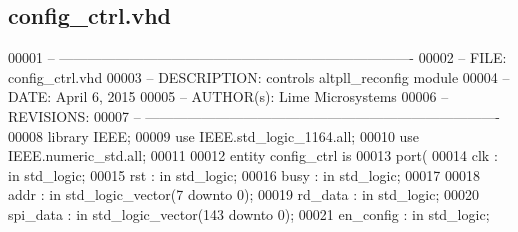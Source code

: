 \subsection{config\+\_\+ctrl.\+vhd}
\label{config__ctrl_8vhd_source}

\begin{DoxyCode}
00001 \textcolor{keyword}{-- ---------------------------------------------------------------------------- }
00002 \textcolor{keyword}{-- FILE:    config\_ctrl.vhd}
00003 \textcolor{keyword}{-- DESCRIPTION: controls altpll\_reconfig module}
00004 \textcolor{keyword}{-- DATE:    April 6, 2015}
00005 \textcolor{keyword}{-- AUTHOR(s):   Lime Microsystems}
00006 \textcolor{keyword}{-- REVISIONS:}
00007 \textcolor{keyword}{-- ----------------------------------------------------------------------------}
00008 \textcolor{vhdlkeyword}{library }\textcolor{keywordflow}{IEEE};
00009 \textcolor{vhdlkeyword}{use }IEEE.std\_logic\_1164.\textcolor{keywordflow}{all};
00010 \textcolor{vhdlkeyword}{use }IEEE.numeric\_std.\textcolor{keywordflow}{all};
00011 
00012 \textcolor{keywordflow}{entity }config_ctrl \textcolor{keywordflow}{is}
00013 \textcolor{keywordflow}{port}\textcolor{vhdlchar}{(}
00014     \textcolor{vhdlchar}{clk}     \textcolor{vhdlchar}{:} \textcolor{keywordflow}{in} \textcolor{comment}{std\_logic};
00015     \textcolor{vhdlchar}{rst}     \textcolor{vhdlchar}{:} \textcolor{keywordflow}{in} \textcolor{comment}{std\_logic};
00016     \textcolor{vhdlchar}{busy}    \textcolor{vhdlchar}{:} \textcolor{keywordflow}{in} \textcolor{comment}{std\_logic};
00017     
00018     \textcolor{vhdlchar}{addr}            \textcolor{vhdlchar}{:} \textcolor{keywordflow}{in} \textcolor{comment}{std\_logic\_vector}\textcolor{vhdlchar}{(}\textcolor{vhdllogic}{}\textcolor{vhdllogic}{7} \textcolor{keywordflow}{downto} \textcolor{vhdllogic}{}\textcolor{vhdllogic}{0}\textcolor{vhdlchar}{)};
00019     \textcolor{vhdlchar}{rd_data}         \textcolor{vhdlchar}{:} \textcolor{keywordflow}{in} \textcolor{comment}{std\_logic};
00020     \textcolor{vhdlchar}{spi_data}        \textcolor{vhdlchar}{:} \textcolor{keywordflow}{in} \textcolor{comment}{std\_logic\_vector}\textcolor{vhdlchar}{(}\textcolor{vhdllogic}{}\textcolor{vhdllogic}{143} \textcolor{keywordflow}{downto} \textcolor{vhdllogic}{}\textcolor{vhdllogic}{0}\textcolor{vhdlchar}{)};
00021     \textcolor{vhdlchar}{en_config}   \textcolor{vhdlchar}{:} \textcolor{keywordflow}{in}    \textcolor{comment}{std\_logic};

\end{DoxyCode}
